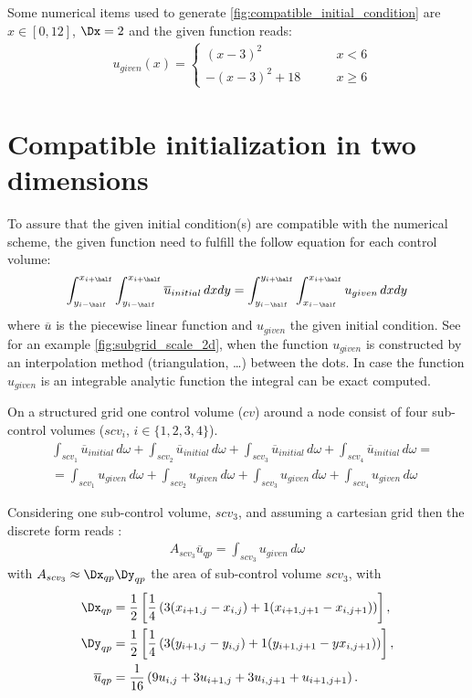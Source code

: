 Some numerical items used to generate \autoref{fig:compatible_initial_condition} are $x \in [0, 12]$, $\Dx=2$ and the given function reads:
\begin{align}
    &u_{given}(x) =
    \begin{cases}
        (x-3)^2 & \qquad x < 6
        \\
        -(x-3)^2 + 18 & \qquad x \geq 6
    \end{cases}
\end{align}
\section{Compatible initialization in two dimensions}\label{sec:compatible_initialization}
To assure that the given initial condition(s) are compatible with the numerical scheme, the given function need to fulfill the follow equation for each control volume:
\begin{align}
    \int_{y_{i-\half}}^{x_{i+\half}} \int_{y_{i-\half}}^{x_{i+\half}} \overline u_{initial}\, dxdy = \int_{y_{i-\half}}^{y_{i+\half}} \int_{x_{i-\half}}^{x_{i+\half}} u_{given}\, dxdy \label{eq:compatible_initialization}
\end{align}
where $\overline{u}$ is the piecewise linear function and $u_{given}$ the given initial condition.
See for an example \autoref{fig:subgrid_scale_2d}, when the function $u_{given}$ is constructed by an interpolation method (triangulation, \ldots) between the dots.
In case the function $u_{given}$ is an integrable analytic function the integral can be exact computed.

On a structured grid one control volume ($cv$) around a node consist of four sub-control volumes ($scv_i$, $i\in\{1,2,3,4\}$).
\begin{align}
    &\int_{scv_1} \overline u_{initial}\, d\omega +
    \int_{scv_2} \overline u_{initial}\, d\omega +
    \int_{scv_3} \overline u_{initial}\, d\omega +
    \int_{scv_4} \overline u_{initial}\, d\omega
    =
    \nonumber \\
    & =\int_{scv_1} u_{given}\, d\omega +
    \int_{scv_2} u_{given}\, d\omega +
    \int_{scv_3} u_{given}\, d\omega +
    \int_{scv_4} u_{given}\, d\omega
\end{align}

Considering one sub-control volume, $scv_3$, and assuming a
cartesian grid then the discrete form reads :
\begin{align}
A_{scv_3} \overline{u}_{qp} = \int_{scv_3} u_{given}\, d\omega
\end{align}
with $A_{scv_3} \approx \Dx_{qp}\Dy_{qp}$ the area of sub-control volume $scv_3$, with
\begin{align}
    \Dx_{qp} & = \frac{1}{2}\left[\frac{1}{4}\left( 3 (x_{i+1,j} - x_{i,j}) + 1 (x_{i+1,j+1} - x_{i,j+1}) \right)\right],
    \\
    \Dy_{qp} & = \frac{1}{2}\left[\frac{1}{4}\left( 3 (y_{i+1,j} - y_{i,j}) + 1 (y_{i+1,j+1} - yx_{i,j+1}) \right)\right],
    \\
    \overline{u}_{qp} & = \frac{1}{16} \left( 9 u_{i,j} + 3 u_{i+1,j} + 3 u_{i, j+1} + u_{i+1, j+1} \right).
\end{align}

